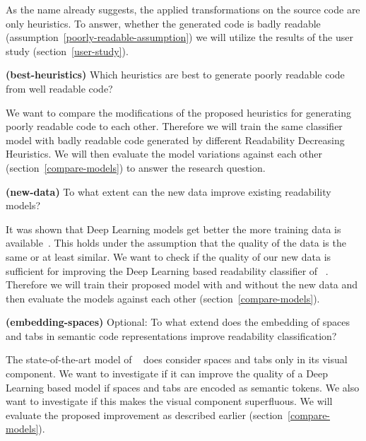 \documentclass[%
class=scrreprt,
chapterprefix=false,%
open=right,%
twoside=false,%
paper=a4,%
logofile={Logo\_zentral\_farbig\_EN.png},%
thesistype=master,%
UKenglish,%
]{se2thesis}
\begin{document}
	As the name already suggests, the applied transformations on the source code are only heuristics. To answer, whether the generated code is badly readable (assumption~\ref{poorly-readable-assumption}) we will utilize the results of the user study (section~\ref{user-study}).
	
	\begin{resq} \textbf{(best-heuristics)} Which heuristics are best to generate poorly readable code from well readable code?\end{resq} \label{best-heuristic}
	We want to compare the modifications of the proposed heuristics for generating poorly readable code to each other. Therefore we will train the same classifier model with badly readable code generated by different Readability Decreasing Heuristics. We will then evaluate the model variations against each other (section~\ref{compare-models}) to answer the research question.
	
	\begin{resq} \textbf{(new-data)} To what extent can the new data improve existing readability models?\end{resq} \label{new-data}
	It was shown that Deep Learning models get better the more training data is available~\cite{hestness2017deep}. This holds under the assumption that the quality of the data is the same or at least similar. We want to check if the quality of our new data is sufficient for improving the Deep Learning based readability classifier of \citeauthor{mi2022towards}~\cite{mi2022towards}. Therefore we will train their proposed model with and without the new data and then evaluate the models against each other (section~\ref{compare-models}).
	
	\pagebreak
	
	
	\begin{resq} \textbf{(embedding-spaces)} Optional: To what extend does the embedding of spaces and tabs in semantic code representations improve readability classification?\end{resq} \label{embedding-spaces}
	The state-of-the-art model of \citeauthor{mi2022towards}~\cite{mi2022towards} does consider spaces and tabs only in its visual component. We want to investigate if it can improve the quality of a Deep Learning based model if spaces and tabs are encoded as semantic tokens. We also want to investigate if this makes the visual component superfluous. We will evaluate the proposed improvement as described earlier (section~\ref{compare-models}).
	
\end{document}

